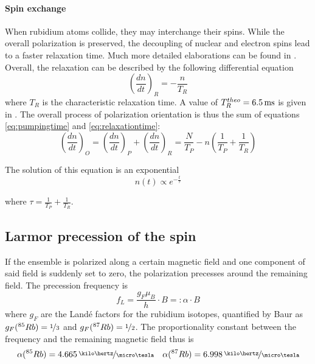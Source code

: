 \paragraph{Spin exchange}
When rubidium atoms collide, they may interchange their spins. While the overall polarization is preserved, the decoupling of nuclear and electron spins lead to a faster relaxation time. Much more detailed elaborations can be found in \cite{happer}.\\

Overall, the relaxation can be described by the following differential equation
\begin{equation}
\left(\frac{dn}{dt}\right)_R=-\frac{n}{T_R}
\label{eq:relaxationtime}
\end{equation}
where $T_R$ is the characteristic relaxation time. A value of $T^{theo}_R=\unit[6.5]{ms}$ is given in \cite{staatsex}. The overall process of polarization orientation is thus the sum of equations \ref{eq:pumpingtime} and \ref{eq:relaxationtime}:
\begin{equation}
\left(\frac{dn}{dt}\right)_O=\left(\frac{dn}{dt}\right)_P+\left(\frac{dn}{dt}\right)_R=\frac{N}{T_P}-n\left(\frac{1}{T_P}+\frac{1}{T_R}\right)
\end{equation}

The solution of this equation is an exponential
\begin{equation}
n(t)\propto e^{-\frac{t}{\tau}}
\label{eq:orientationexponential}
\end{equation}

where $\tau=\frac{1}{T_P}+\frac{1}{T_R}$.

\subsection{Larmor precession of the spin}
If the ensemble is polarized along a certain magnetic field and one component of said field is suddenly set to zero, the polarization precesses around the remaining field. The precession frequency is
\begin{equation}
f_L=\frac{g_F\mu_B}{h}\cdot B =: \alpha\cdot B
\label{eq:precessionfreq}
\end{equation}
where $g_F$ are the Landé factors for the rubidium isotopes, quantified by Baur \cite{staatsex} as $g_F(^{85}Rb)=\nicefrac{1}{3}$ and $g_F(^{87}Rb)=\nicefrac{1}{2}$. The proportionality constant between the frequency and the remaining magnetic field thus is 
\begin{equation}
\alpha(^{85}Rb)=\unitfrac[4.665]{\kilo\hertz}{\micro\tesla}\quad \alpha(^{87}Rb)=\unitfrac[6.998]{\kilo\hertz}{\micro\tesla}
\end{equation}

